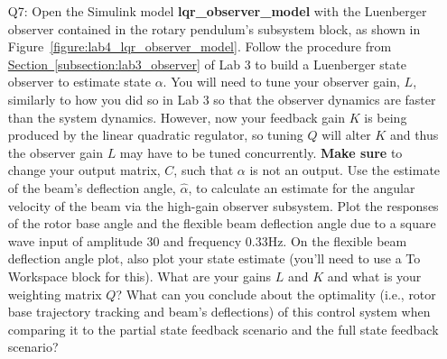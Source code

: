 \documentclass[12pt]{report}
\newcommand\drew[1]{\textcolor{red}{#1}}
\begin{document}
\begin{enumerate}
    \item[Q7:] Open the Simulink model \textbf{lqr\_observer\_model} with the Luenberger observer contained in the rotary pendulum's subsystem block, as shown in Figure~\ref{figure:lab4_lqr_observer_model}. Follow the procedure from \hyperref[subsection:lab3_observer]{Section~\ref{subsection:lab3_observer}} of Lab 3 to build a Luenberger state observer to estimate state $\alpha$. You will need to tune your observer gain, $L$, similarly to how you did so in Lab 3 so that the observer dynamics are faster than the system dynamics. However, now your feedback gain $K$ is being produced by the linear quadratic regulator, so tuning $Q$ will alter $K$ and thus the observer gain $L$ may have to be tuned concurrently. \textbf{Make sure} to change your output matrix, $C$, such that $\alpha$ is not an output. Use the estimate of the beam's deflection angle, $\hat{\alpha}$, to calculate an estimate for the angular velocity of the beam via the high-gain observer subsystem. Plot the responses of the rotor base angle and the flexible beam deflection angle due to a square wave input of amplitude 30 and frequency 0.33Hz. On the flexible beam deflection angle plot, also plot your state estimate (you'll need to use a To Workspace block for this). What are your gains $L$ and $K$ and what is your weighting matrix $Q$? What can you conclude about the optimality (i.e., rotor base trajectory tracking and beam's deflections) of this control system when comparing it to the partial state feedback scenario and the full state feedback scenario?\\

\end{enumerate}
\end{document}
